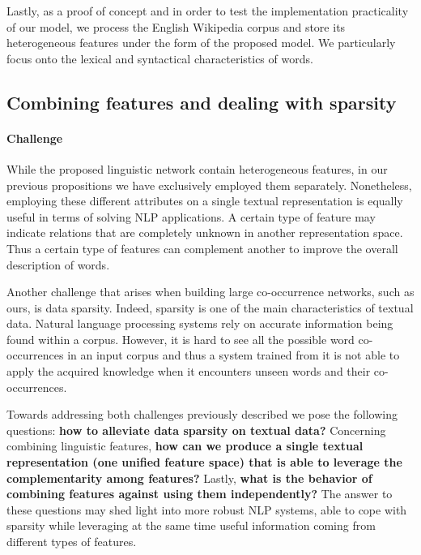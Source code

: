 Lastly, as a proof of concept and in order to test the implementation practicality of our model, we process the English Wikipedia corpus and store its heterogeneous features under the form of the proposed model. We particularly focus onto the lexical and syntactical characteristics of words.


\subsection{Combining features and dealing with sparsity}
\paragraph{Challenge}

While the proposed linguistic network contain heterogeneous features, in our previous propositions we have exclusively employed them separately. Nonetheless, employing these different attributes on a single textual representation is equally useful in terms of solving NLP applications. A certain type of feature may indicate relations that are completely unknown in another representation space. Thus a certain type of features can complement another to improve the overall description of words.

Another challenge that arises when building large co-occurrence networks, such as ours, is data sparsity. Indeed, sparsity is one of the main characteristics of textual data. Natural language processing systems rely on accurate information being found within a corpus. However, it is hard to see all the possible word co-occurrences in an input corpus and thus a system trained from it is not able to apply the acquired knowledge when it encounters unseen words and their co-occurrences.


Towards addressing both challenges previously described we pose the following questions: \textbf{how to alleviate data sparsity on textual data?}  Concerning combining linguistic features, \textbf{how can we produce a single textual representation (one unified feature space) that is able to leverage the complementarity among features?} Lastly, \textbf{what is the behavior of combining features against using them independently?} The answer to these questions may shed light into more robust NLP systems, able to cope with sparsity while leveraging at the same time useful information coming from different types of features.





